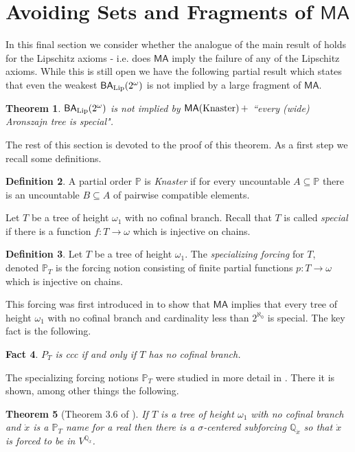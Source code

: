 \documentclass[leqno,11pt]{amsart}
\newtheorem{theorem}{Theorem}[section]
\newtheorem{fact}[theorem]{Fact}
\theoremstyle{definition}
\newtheorem{definition}[theorem]{Definition}
\theoremstyle{remark}
\def\MA{\mathsf{MA}}
\def\BA{\mathsf{BA}}
\def\Q{\mathbb Q}
\def\P{\mathbb P}
\def\cc{2^{\aleph_0}}
\begin{document}
\section{Avoiding Sets and Fragments of $\MA$}

In this final section we consider whether the analogue of the main result of \cite{AvrahamShelah81} holds for the Lipschitz axioms - i.e. does $\MA$ imply the failure of any of the Lipschitz axioms. While this is still open we have the following partial result which states that even the weakest $\BA_{\rm Lip}(2^\omega)$ is not implied by a large fragment of $\MA$. 

\begin{theorem}
    $\BA_{\rm Lip}(2^\omega)$ is not implied by $\MA ({\rm Knaster}) \, +$ ``every (wide) Aronszajn tree is special". \label{noimplicationofMA}
\end{theorem}

The rest of this section is devoted to the proof of this theorem. As a first step we recall some definitions.
\begin{definition}
    A partial order $\P$ is {\em Knaster} if for every uncountable $A \subseteq \P$ there is an uncountable $B \subseteq A$ of pairwise compatible elements.
\end{definition}

Let $T$ be a tree of height $\omega_1$ with no cofinal branch. Recall that $T$ is called {\em special} if there is a function $f:T \to \omega$ which is injective on chains.
\begin{definition}
    Let $T$ be a tree of height $\omega_1$. The {\em specializing forcing} for $T$, denoted $\P_T$ is the forcing notion consisting of finite partial functions $p:T \to \omega$ which is injective on chains.
\end{definition}
This forcing was first introduced in \cite{BMR70} to show that $\MA$ implies that every tree of height $\omega_1$ with no cofinal branch and cardinality less than $\cc$ is special. The key fact is the following.
\begin{fact}
    $P_T$ is ccc if and only if $T$ has no cofinal branch.
\end{fact}
The specializing forcing notions $\P_T$ were studied in more detail in \cite{specialtree}. There it is shown, among other things the following.
\begin{theorem}[Theorem 3.6 of \cite{specialtree}]
    If $T$ is a tree of height $\omega_1$ with no cofinal branch and $\dot{x}$ is a $\P_T$ name for a real then there is a $\sigma$-centered subforcing $\Q_{\dot{x}}$ so that $\dot{x}$ is forced to be in $V^{\Q_{\dot{x}}}$. \label{theoremspecial}
\end{theorem}
\end{document}
